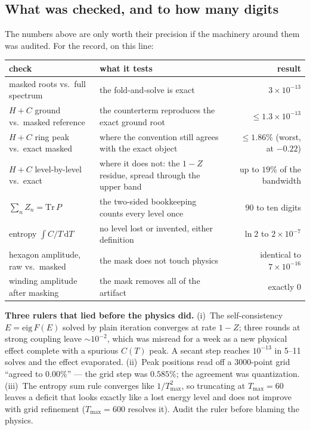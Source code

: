 \documentclass[11pt,a4paper]{article}
\begin{document}
\subsection{What was checked, and to how many digits}

The numbers above are only worth their precision if the machinery around
them was audited.  For the record, on this line:

\begin{center}
\small
\begin{tabular}{lp{6.2cm}r}
\toprule
check & what it tests & result\\
\midrule
masked roots vs.\ full spectrum & the fold-and-solve is exact &
$3\times10^{-13}$\\
$H+C$ ground vs.\ masked reference & the counterterm reproduces the exact
ground root & $\le1.3\times10^{-13}$\\
$H+C$ ring peak vs.\ exact masked & where the convention still agrees with
the exact object & $\le1.86\%$ (worst, at $-0.22$)\\
$H+C$ level-by-level vs.\ exact & where it does not: the $1-Z$ residue,
spread through the upper band & up to $19\%$ of the bandwidth\\
$\sum_n Z_n=\mathrm{Tr}\,P$ & the two-sided bookkeeping counts every level
once & $90$ to ten digits\\
entropy $\int C/T\,\mathrm{d}T$ & no level lost or invented, either
definition & $\ln2$ to $2\times10^{-7}$\\
hexagon amplitude, raw vs.\ masked & the mask does not touch physics &
identical to $7\times10^{-16}$\\
winding amplitude after masking & the mask removes all of the artifact &
exactly $0$\\
\bottomrule
\end{tabular}
\end{center}

\begin{lesson}
\textbf{Three rulers that lied before the physics did.}  (i)~The
self-consistency $E=\mathrm{eig}\,F(E)$ solved by plain iteration converges
at rate $1-Z$; three rounds at strong coupling leave $\sim10^{-2}$, which
was misread for a week as a new physical effect complete with a spurious
$C(T)$ peak.  A secant step reaches $10^{-13}$ in 5--11 solves and the
effect evaporated.  (ii)~Peak positions read off a $3000$-point grid
``agreed to $0.00\%$'' --- the grid step was $0.585\%$; the agreement was
quantization.  (iii)~The entropy sum rule converges like $1/T_{\max}^2$, so
truncating at $T_{\max}=60$ leaves a deficit that looks exactly like a lost
energy level and does not improve with grid refinement ($T_{\max}=600$
resolves it).  Audit the ruler before blaming the physics.
\end{lesson}
\end{document}
